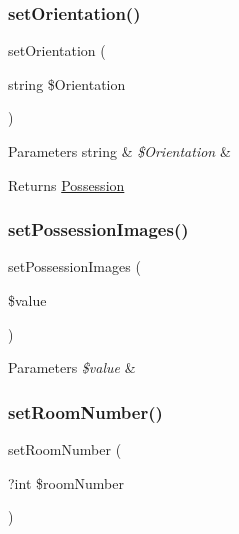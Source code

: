 \subsubsection{\texorpdfstring{setOrientation()}{setOrientation()}}
{\footnotesize\ttfamily set\+Orientation (\begin{DoxyParamCaption}\item[{string}]{\$\+Orientation }\end{DoxyParamCaption})}


\begin{DoxyParams}[1]{Parameters}
string & {\em \$\+Orientation} & \\
\hline
\end{DoxyParams}
\begin{DoxyReturn}{Returns}
\mbox{\hyperlink{class_app_1_1_entity_1_1_possession}{Possession}} 
\end{DoxyReturn}
\mbox{\label{class_app_1_1_entity_1_1_possession_a4adfc8fe6a8861e0d2eb25c0388649fc}} 
\subsubsection{\texorpdfstring{setPossessionImages()}{setPossessionImages()}}
{\footnotesize\ttfamily set\+Possession\+Images (\begin{DoxyParamCaption}\item[{}]{\$value }\end{DoxyParamCaption})}


\begin{DoxyParams}{Parameters}
{\em \$value} & \\
\hline
\end{DoxyParams}
\mbox{\label{class_app_1_1_entity_1_1_possession_a15a22e1c845fbd522c7a0b5242de22c0}} 
\subsubsection{\texorpdfstring{setRoomNumber()}{setRoomNumber()}}
{\footnotesize\ttfamily set\+Room\+Number (\begin{DoxyParamCaption}\item[{?int}]{\$room\+Number }\end{DoxyParamCaption})}


